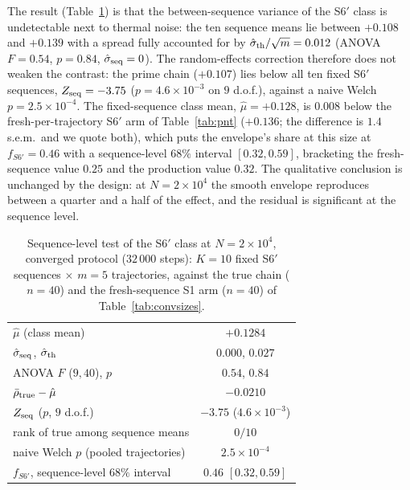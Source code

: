 \documentclass[reprint,amsmath,amssymb,aps,pre,longbibliography]{revtex4-2}
\begin{document}
The result (Table~\ref{tab:re}) is that the between-sequence variance of the S6$'$ class is
undetectable next to thermal noise: the ten sequence means lie between $+0.108$ and
$+0.139$ with a spread fully accounted for by $\hat\sigma_{\rm th}/\sqrt{m}=0.012$
(ANOVA $F=0.54$, $p=0.84$, $\hat\sigma_{\rm seq}=0$). The random-effects correction
therefore does not weaken the contrast: the prime chain ($+0.107$) lies below all ten fixed
S6$'$ sequences, $Z_{\rm seq}=-3.75$ ($p=4.6\times10^{-3}$ on $9$ d.o.f.), against a naive
Welch $p=2.5\times10^{-4}$. The fixed-sequence class mean, $\hat\mu=+0.128$, is $0.008$
below the fresh-per-trajectory S6$'$ arm of Table~\ref{tab:pnt} ($+0.136$; the difference
is $1.4$ s.e.m.\ and we quote both), which puts the envelope's share at this size at
$f_{S6'}=0.46$ with a sequence-level $68\%$ interval $[0.32,0.59]$, bracketing the
fresh-sequence value $0.25$ and the production value $0.32$. The qualitative conclusion is
unchanged by the design: at $N=2\times10^{4}$ the smooth envelope reproduces between a
quarter and a half of the effect, and the residual is significant at the sequence level.

\begin{table}[t]
\caption{Sequence-level test of the S6$'$ class at $N=2\times10^{4}$, converged protocol
($32\,000$ steps): $K=10$ fixed S6$'$ sequences $\times$ $m=5$ trajectories, against the
true chain ($n=40$) and the fresh-sequence S1 arm ($n=40$) of Table~\ref{tab:convsizes}.}
\label{tab:re}
\footnotesize
\begin{ruledtabular}
\begin{tabular}{lc}
$\hat\mu$ (class mean) & $+0.1284$\\
$\hat\sigma_{\rm seq}$, $\hat\sigma_{\rm th}$ & $0.000$, $0.027$\\
ANOVA $F$ ($9,40$), $p$ & $0.54$, $0.84$\\
$\bar\rho_{\rm true}-\hat\mu$ & $-0.0210$\\
$Z_{\rm seq}$ ($p$, $9$ d.o.f.) & $-3.75$ ($4.6\times10^{-3}$)\\
rank of true among sequence means & $0/10$\\
naive Welch $p$ (pooled trajectories) & $2.5\times10^{-4}$\\
$f_{S6'}$, sequence-level $68\%$ interval & $0.46$ $[0.32,0.59]$\\
\end{tabular}
\end{ruledtabular}
\end{table}
\end{document}
